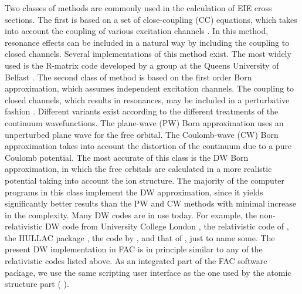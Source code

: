 \documentclass{elsart}
\begin{document}
Two classes of methods are commonly used in the calculation of EIE cross
sections. The first is based on a set of close-coupling (CC) equations, which
takes into account the coupling of various excitation channels
\citep{seaton75}. In this method, resonance effects can be included in a
natural way by including the coupling to closed channels. Several
implementations of this method exist. The most widely used is the R-matrix
code developed by a group at the Queens University of Belfast
\citep{berrington95}. The second class of method is based on the first order
Born approximation, which assumes independent excitation channels. The
coupling to closed channels, which results in resonances, may be included in a
perturbative fashion \citep{eissner72}. Different variants exist according to
the different treatments of the continuum wavefunctions. The plane-wave (PW)
Born approximation uses an unperturbed plane wave for the free orbital. The
Coulomb-wave (CW) Born approximation takes into account the distortion of the
continuum due to a pure Coulomb potential. The most accurate of this class is
the DW Born approximation, in which the free orbitals are
calculated in a more realistic potential taking into account the ion
structure. The majority of the computer programs in this class implement the DW
approximation, since it yields significantly better results than the PW and CW
methods with minimal increase in the complexity. Many DW codes are in use
today. For example, the non-relativistic DW code from University College
London \citep{eissner98}, the relativistic code of \citet{hagelstein87}, the
HULLAC package \citep{barshalom88}, the code by \citet{zhang89}, and that of
\citet{chen96}, just to name some. The present DW implementation in FAC is in
principle similar to any of the relativistic codes listed above. As an
integrated part of the FAC software package, we use the same scripting user
interface as the one used by the atomic structure part (
\citep{gu01a}). 
\end{document}

